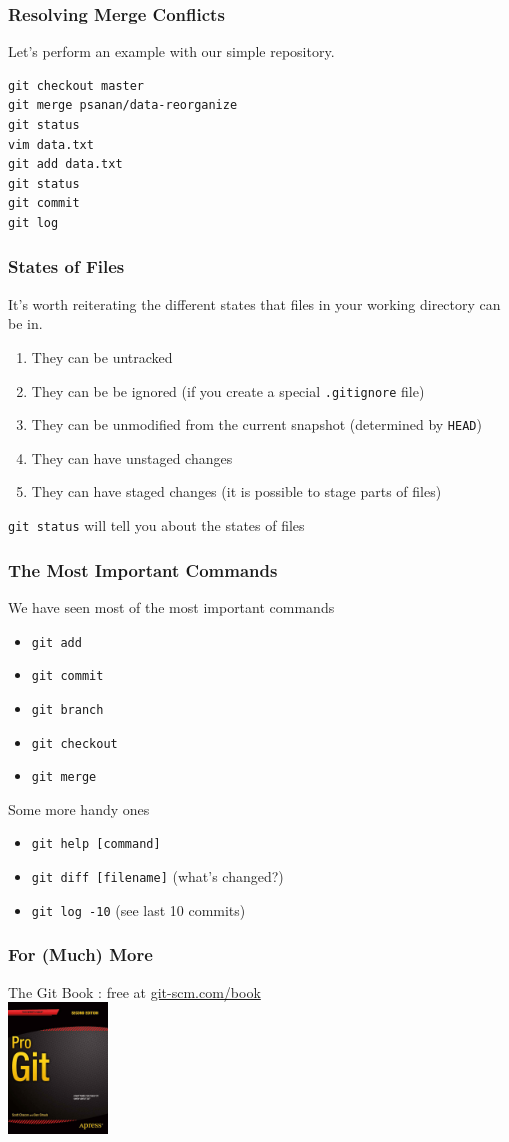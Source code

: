 \documentclass{beamer}
\begin{document}
\begin{frame}[fragile]
\frametitle{Resolving Merge Conflicts}
Let's perform an example with our simple repository.
\begin{lstlisting}
git checkout master
git merge psanan/data-reorganize
git status
vim data.txt
git add data.txt
git status
git commit
git log
\end{lstlisting}
\end{frame}

\begin{frame}[fragile]
\frametitle{States of Files}
It's worth reiterating the different states that files in your working directory can be in.
\begin{enumerate}
\item They can be untracked
\item They can be be ignored (if you create a special \texttt{.gitignore} file)
\item They can be unmodified from the current snapshot (determined by \texttt{HEAD})
\item They can have unstaged changes
\item They can have staged changes (it is possible to stage parts of files)
\end{enumerate}
\lstinline{git status} will tell you about the states of files
\end{frame}

\begin{frame}[fragile]
\frametitle{The Most Important Commands}
We have seen most of the most important commands
\begin{itemize}
\item \lstinline{git add}
\item \lstinline{git commit}
\item \lstinline{git branch}
\item \lstinline{git checkout}
\item \lstinline{git merge}
\end{itemize}

Some more handy ones
\begin{itemize}
\item \lstinline{git help [command]}
\item \lstinline{git diff [filename]} (what's changed?)
\item \lstinline{git log -10} (see last 10 commits)
\end{itemize}
\end{frame}

\begin{frame}[fragile]
\frametitle{For (Much) More}
The Git Book : free at \href{https://git-scm.com/book}{git-scm.com/book} \\
\includegraphics[width=100px]{progit2}
\end{frame}
\end{document}
